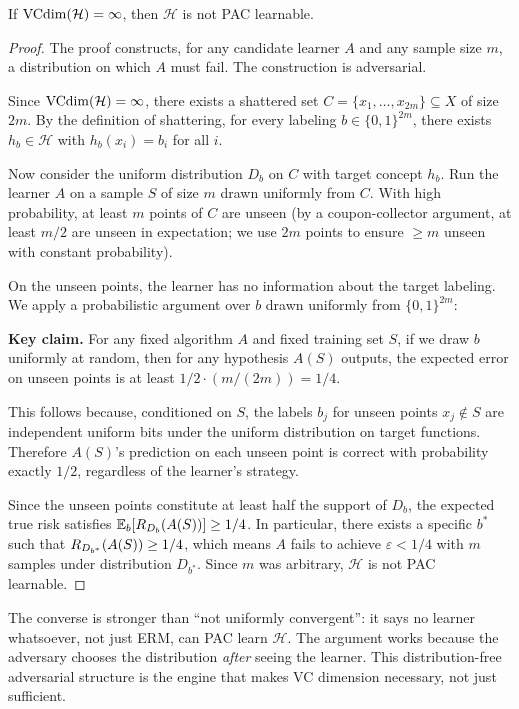 \begin{thm}
\label{thm:vc-converse}
If $\mathrm{VCdim}(\mathcal{H}) = \infty$, then $\mathcal{H}$ is not PAC learnable.
\end{thm}

\begin{proof}
The proof constructs, for any candidate learner $A$ and any sample size $m$,
a distribution on which $A$ must fail.  The construction is adversarial.

Since $\mathrm{VCdim}(\mathcal{H}) = \infty$, there exists a shattered set
$C = \{x_1, \ldots, x_{2m}\} \subseteq X$ of size $2m$.  By the definition of
shattering, for every labeling $b \in \{0,1\}^{2m}$, there exists
$h_b \in \mathcal{H}$ with $h_b(x_i) = b_i$ for all $i$.

Now consider the uniform distribution $D_b$ on $C$ with target concept $h_b$.
Run the learner $A$ on a sample $S$ of size $m$ drawn uniformly from $C$.
With high probability, at least $m$ points of $C$ are unseen
(by a coupon-collector argument, at least $m/2$ are unseen in expectation; we
use $2m$ points to ensure $\geq m$ unseen with constant probability).

On the unseen points, the learner has no information about the target labeling.
We apply a probabilistic argument over $b$ drawn uniformly from $\{0,1\}^{2m}$:

\medskip
\noindent\textbf{Key claim.}  For any fixed algorithm $A$ and fixed training
set $S$, if we draw $b$ uniformly at random, then for any hypothesis $A(S)$
outputs, the expected error on unseen points is at least $1/2 \cdot (m/(2m))
= 1/4$.

This follows because, conditioned on $S$, the labels $b_j$ for unseen points
$x_j \notin S$ are independent uniform bits under the uniform distribution on
target functions.  Therefore $A(S)$'s prediction on each unseen point is
correct with probability exactly $1/2$, regardless of the learner's strategy.

Since the unseen points constitute at least half the support of $D_b$, the
expected true risk satisfies $\mathbb{E}_b[R_{D_b}(A(S))] \geq 1/4$.  In
particular, there exists a specific $b^*$ such that
$R_{D_{b^*}}(A(S)) \geq 1/4$, which means $A$ fails to achieve
$\varepsilon < 1/4$ with $m$ samples under distribution $D_{b^*}$.  Since $m$
was arbitrary, $\mathcal{H}$ is not PAC learnable.
\end{proof}

\begin{remark}
\label{rmk:converse-strength}
The converse is stronger than ``not uniformly convergent'': it says no learner
whatsoever, not just ERM, can PAC learn $\mathcal{H}$.  The argument works
because the adversary chooses the distribution \emph{after} seeing the learner.
This distribution-free adversarial structure is the engine that makes VC
dimension necessary, not just sufficient.
\end{remark}

